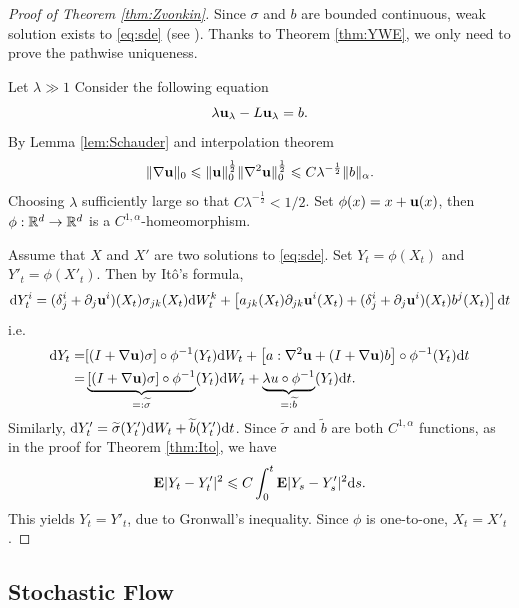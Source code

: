 \begin{proof}[Proof of Theorem \ref{thm:Zvonkin}] 
		Since $\sigma$ and $b$ are bounded continuous, weak solution exists to \eqref{eq:sde} (see \cite{Huang}). Thanks to Theorem \ref{thm:YWE}, we only need to prove the pathwise uniqueness. 
		
	Let \(\lambda\gg 1\) Consider the following equation 
		\[
		\lambda {\bf u}_\lambda - L {\bf u}_\lambda = b. 
		\]
		By Lemma \ref{lem:Schauder} and interpolation theorem 
		\[
		\|\nabla {\bf u} \|_{0} \leq \|{\bf u}\|_{0}^{\frac{1}{2}} \|\nabla^2 {\bf u}\|_{0}^{\frac{1}{2}} \leq   C \lambda^{-\frac{1}{2}} \|b\|_{\alpha}. 
		\]
		Choosing $\lambda$ sufficiently large so that $C \lambda^{-\frac{1}{2}} <1/2$.  Set $\phi (x) = x + {\bf u}(x)$, then $\phi: \mR^d \to \mR^d$ is a $C^{1,\alpha}$-homeomorphism. 
		
		Assume that $X$ and $X'$ are two solutions to \eqref{eq:sde}. Set $Y_t=\phi(X_t)$ and $Y'_t=\phi(X'_t)$. Then by It\^o's formula, 
		\begin{equation*}
			\d Y_t^i = (\delta^i_j+\p_j {\bf u}^i)(X_t) \sigma_{jk} (X_t) \d W_t^k + \l[  a_{jk}(X_t)\p_{jk}{\bf u}^i (X_t)+ (\delta^i_j+\p_j {\bf u}^i)(X_t) b^j (X_t) \r]  \d t
		\end{equation*}
		i.e. 
		\begin{equation*}
			\begin{aligned}
				\d Y_t=& [(I+\nabla {\bf u})\sigma ]\circ \phi^{-1}(Y_t) \d W_t + \l[ a:\nabla^2 {\bf u}+ (I+\nabla {\bf u})b\r] \circ \phi^{-1}(Y_t)   \d t \\
				=&  \underbrace{[(I+\nabla {\bf u})\sigma ]\circ \phi^{-1} }_{=:\widetilde{\sigma}}(Y_t) \d W_t  + \underbrace{\lambda u \circ\phi^{-1}}_{=:\widetilde{b}} (Y_t) \d t. 
			\end{aligned}
		\end{equation*}
		Similarly, $\d Y'_t = \widetilde{\sigma}(Y'_t)\d W_t + \widetilde{b}(Y'_t) \d t$. Since $\widetilde{\sigma}$ and $\widetilde{b}$ are both $C^{1,\alpha}$ functions, as in the proof for Theorem \ref{thm:Ito}, we have 
		\[
		\bE |Y_t-Y'_t|^2 \leq C \int_0^t \bE |Y_s-Y'_s|^2 \d s.  
		\]
		This yields $Y_t=Y'_t$, due to Gronwall's inequality. Since $\phi$ is one-to-one, $X_t=X'_t$. 
	\end{proof}
	
	\subsection{Stochastic Flow}

